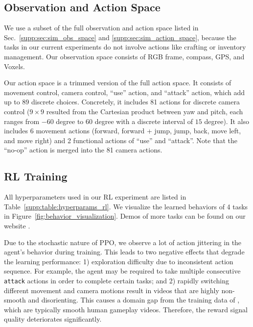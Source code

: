 

\subsection{Observation and Action Space}

We use a subset of the full observation and action space listed in Sec.~\ref{supp:sec:sim_obs_space} and \ref{supp:sec:sim_action_space}, because the tasks in our current experiments do not involve actions like crafting or inventory management. Our observation space consists of RGB frame, compass, GPS, and Voxels.

Our action space is a trimmed version of the full action space. It consists of movement control, camera control, ``use'' action, and ``attack'' action, which add up to 89 discrete choices. Concretely, it includes 81 actions for discrete camera control ($9 \times 9$ resulted from the Cartesian product between yaw and pitch, each ranges from $-60$ degree to $60$ degree with a discrete interval of $15$ degree). It also includes 6 movement actions (forward, forward + jump, jump, back, move left, and move right) and 2 functional actions of ``use'' and ``attack''. Note that the ``no-op'' action is merged into the 81 camera actions. 


\subsection{RL Training}
All hyperparameters used in our RL experiment are listed in Table~\ref{supp:table:hyperparams_rl}. We visualize the learned behaviors of 4 tasks in Figure~\ref{fig:behavior_visualization}. Demos of more tasks can be found on our website \weburl.

Due to the stochastic nature of PPO, we observe a lot of action jittering in the agent's behavior during training. This leads to two negative effects that degrade the learning performance: 1) exploration difficulty due to inconsistent action sequence. For example, the agent may be required to take multiple consecutive \texttt{attack} actions in order to complete certain tasks; and 2) rapidly switching different movement and camera motions result in videos that are highly non-smooth and disorienting. This causes a domain gap from the training data of \mineclip, which are typically smooth human gameplay videos. Therefore, the reward signal quality deteriorates significantly.

